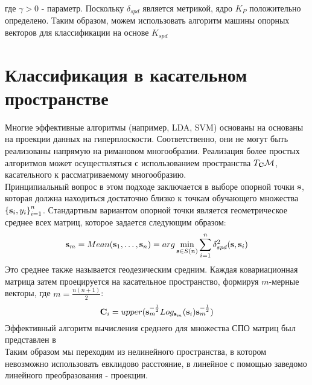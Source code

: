 где $\gamma>0$ - параметр. Поскольку $\delta_{spd}$ является метрикой, ядро $K_P$ положительно определено. Таким образом, можем использовать алгоритм машины опорных векторов \cite{scholkopf2001learning} для классификации на основе $K_{spd}$ 

\section{Классификация в касательном пространстве}
 \indent Многие эффективные алгоритмы (например, LDA, SVM) основаны на основаны на проекции данных на гиперплоскости. Соответственно, они не могут быть реализованы напрямую на римановом многообразии. Реализация более простых алгоритмов может осуществляться с использованием пространства $T_{\bf C} \mathcal{M}$, касательного к рассматриваемому многообразию.  \\
\indent Принципиальный вопрос в этом подходе заключается в выборе опорной точки ${\bf s}$, которая должна находиться достаточно близко к точкам обучающего множества $\left\{ {\bf s}_i, y_i \right\}_{i=1}^n$. Стандартным вариантом опорной точки является геометрическое среднее всех матриц, которое задается следующим образом:
 $$ {\bf s}_m = Mean({\bf s}_1, \ldots, {\bf s}_n) = arg \min_{\substack{{\bf s} \in S(n)}}\sum_{\substack{i=1}}^n \delta_{spd}^2({\bf s}, {\bf s}_i) $$
 \indent Это среднее также называется геодезическим средним. Каждая ковариационная матрица затем проецируется на касательное пространство, формируя $m$-мерные векторы, где $m=\frac{n(n+1)}{2}$:
 $$ {\bf C}_i = upper({\bf s}_m^{-\frac{1}{2}}Log_{{\bf s}_m}({\bf s}_i){\bf s}_m^{-\frac{1}{2}}) $$
 \indent Эффективный алгоритм вычисления среднего для множества СПО матриц был представлен в \cite{barachant2013classification} \\
 \indent Таким образом мы переходим из нелинейного пространства, в котором невозможно использовать евклидово расстояние, в линейное с помощью заведомо линейного преобразования - проекции.
